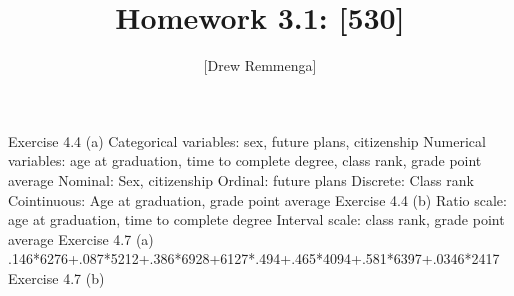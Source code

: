 \documentclass[10pt, oneside]{article}
\title{Homework 3.1: [530]}
\author{[Drew Remmenga]}
\begin{document}
\maketitle
\pagebreak
Exercise 4.4 (a)
Categorical variables: sex, future plans, citizenship
Numerical variables: age at graduation, time to complete degree, class rank, grade point average
Nominal: Sex, citizenship
Ordinal: future plans
Discrete: Class rank
Cointinuous: Age at graduation, grade point average
\clearpage
Exercise 4.4 (b)
Ratio scale: age at graduation, time to complete degree
Interval scale: class rank, grade point average
\clearpage
Exercise 4.7 (a)
.146*6276+.087*5212+.386*6928+6127*.494+.465*4094+.581*6397+.0346*2417
\clearpage
Exercise 4.7 (b)
\end{document}
